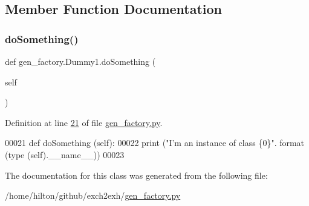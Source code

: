 \subsection{Member Function Documentation}
\mbox{\label{classgen__factory_1_1_dummy1_af8a40601dbd998624323da24581dfa1c}} 
\subsubsection{\texorpdfstring{do\+Something()}{doSomething()}}
{\footnotesize\ttfamily def gen\+\_\+factory.\+Dummy1.\+do\+Something (\begin{DoxyParamCaption}\item[{}]{self }\end{DoxyParamCaption})}



Definition at line \hyperlink{gen__factory_8py_source_l00021}{21} of file \hyperlink{gen__factory_8py_source}{gen\+\_\+factory.\+py}.


\begin{DoxyCode}
00021     \textcolor{keyword}{def }doSomething (self):
00022         \textcolor{keywordflow}{print} (\textcolor{stringliteral}{"I'm an instance of class \{0\}"}. format (type (self).\_\_name\_\_))
00023 
\end{DoxyCode}


The documentation for this class was generated from the following file\+:\begin{DoxyCompactItemize}
\item 
/home/hilton/github/exch2exh/\hyperlink{gen__factory_8py}{gen\+\_\+factory.\+py}\end{DoxyCompactItemize}
